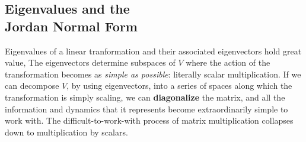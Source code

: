 \begin{appendices}
	

\appendixpage
\noappendicestocpagenum



\chapter[Eigenvalues and the Jordan Normal Form]{Eigenvalues and the\\Jordan Normal Form}



Eigenvalues of a linear tranformation and their associated eigenvectors hold great value, The eigenvectors determine subspaces of $V$ where the action of the transformation becomes as \emph{simple as possible}: literally scalar multiplication. If we can decompose $V$, by using eigenvectors, into a series of spaces along which the transformation is simply scaling, we can \textbf{diagonalize} the matrix, and all the information and dynamics that it represents become extraordinarily simple to work with. The difficult-to-work-with process of matrix multiplication collapses down to multiplication by scalars. \\


\end{appendices}
